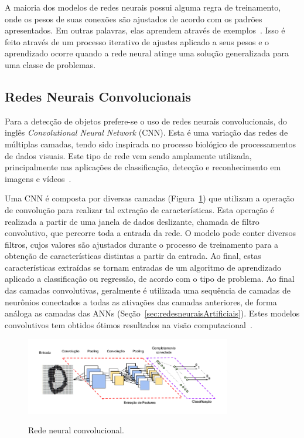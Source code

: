 A maioria dos modelos de redes neurais possui alguma regra de treinamento, onde os pesos de suas conexões são ajustados de acordo com os padrões apresentados. Em outras palavras, elas aprendem através de exemplos~\cite{andreCarvalhoRNA}. Isso é feito através de um processo iterativo de ajustes aplicado a seus pesos e o aprendizado ocorre quando a rede neural atinge uma solução generalizada para uma classe de problemas.


\subsection{Redes Neurais Convolucionais}
\label{sec:redesneuraisConvolucionais}

Para a detecção de objetos prefere-se o uso de redes neurais convolucionais, do inglês \textit{Convolutional Neural Network} (CNN). Esta é uma variação das redes de múltiplas camadas, tendo sido inspirada no processo biológico de processamentos de dados visuais. Este tipo de rede vem sendo amplamente utilizada, principalmente nas aplicações de classificação, detecção e reconhecimento em imagens e vídeos~\cite{vargas2016estudo}.

Uma CNN é composta por diversas camadas (Figura~\ref{fig:CNN}) que utilizam a operação de convolução para realizar tal extração de características. Esta operação é realizada a partir de uma janela de dados deslizante, chamada de filtro convolutivo, que percorre toda a entrada da rede. O modelo pode conter diversos filtros, cujos valores são ajustados durante o processo de treinamento para a obtenção de características distintas a partir da entrada. Ao final, estas características extraídas se tornam entradas de um algoritmo de aprendizado aplicado a classificação ou regressão, de acordo com o tipo de problema. Ao final das camadas convolutivas, geralmente é utilizada uma sequência de camadas de neurônios conectados a todas as ativações das camadas anteriores, de forma análoga as camadas das ANNs (Seção~\ref{sec:redesneuraisArtificiais}). Estes modelos convolutivos tem obtidos ótimos resultados na visão computacional~\cite{oliveira2017redes}.

\begin{figure}[!hbtp]
  \centering
   \caption{Rede neural convolucional.}
    \includegraphics[width = 0.8\textwidth]{Caps/Figs/ref-teorico/CNN.png}
   \label{fig:CNN}
\end{figure}


